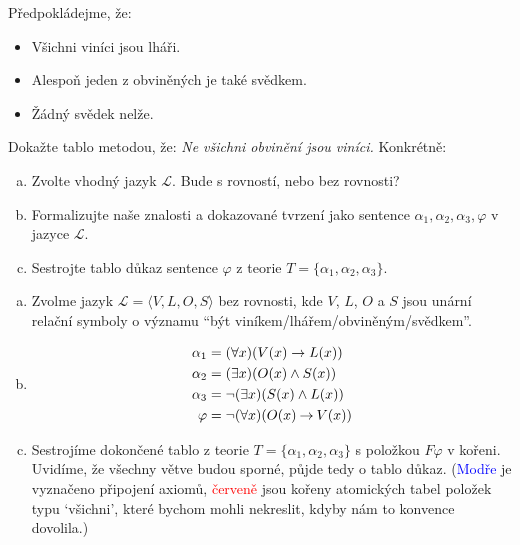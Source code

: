       
\begin{problem}

    Předpokládejme, že:
    \begin{itemize}\it
        \item Všichni viníci jsou lháři.
        \item Alespoň jeden z obviněných je také svědkem.
        \item Žádný svědek nelže.
    \end{itemize}

    Dokažte tablo metodou, že: {\it Ne všichni obvinění jsou viníci.} Konkrétně:
    \begin{enumerate}[(a)]
        \item Zvolte vhodný jazyk $\mathcal L$. Bude s rovností, nebo bez rovnosti?        
        \item Formalizujte naše znalosti a dokazované tvrzení jako sentence $\alpha_1,\alpha_2,\alpha_3,\varphi$ v jazyce $\mathcal L$.
        \item Sestrojte tablo důkaz sentence $\varphi$ z teorie $T=\{\alpha_1,\alpha_2,\alpha_3\}$.
    \end{enumerate}

    \begin{solution}

        \begin{enumerate}[(a)]
            \item Zvolme jazyk $\mathcal L=\langle V,L,O,S\rangle$ bez rovnosti, kde $V$, $L$, $O$ a $S$ jsou unární relační symboly o významu ``být viníkem/lhářem/obviněným/svědkem''.
            \item 
            \begin{align*}
                \alpha_1 & = (\forall x)(V(x)\to L(x)) \\
                \alpha_2 & = (\exists x)(O(x)\land S(x)) \\
                \alpha_3 & = \neg(\exists x)(S(x)\land L(x)) \\
                \varphi & = \neg (\forall x)(O(x)\mathbin{\rightarrow} V(x))
            \end{align*}
            \item Sestrojíme dokončené tablo z teorie $T=\{\alpha_1,\alpha_2,\alpha_3\}$ s položkou $F\varphi$ v kořeni. Uvidíme, že všechny větve budou sporné, půjde tedy o tablo důkaz. (\textcolor{blue}{Modře} je vyznačeno připojení axiomů, \textcolor{red}{červeně} jsou kořeny atomických tabel položek typu `všichni', které bychom mohli nekreslit, kdyby nám to konvence dovolila.)
            

\end{enumerate}
\end{solution}
\end{problem}
